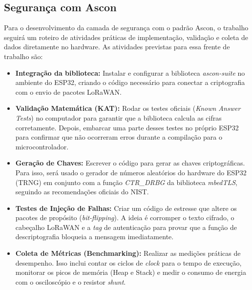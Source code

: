 

\subsection{Segurança com Ascon}
Para o desenvolvimento da camada de segurança com o padrão Ascon, o trabalho seguirá um roteiro de atividades práticas de implementação, validação e coleta de dados diretamente no hardware. As atividades previstas para essa frente de trabalho são:

\begin{itemize}
    \item \textbf{Integração da biblioteca:} Instalar e configurar a biblioteca \textit{ascon-suite} no ambiente do ESP32, criando o código necessário para conectar a criptografia com o envio de pacotes LoRaWAN.
    
    \item \textbf{Validação Matemática (KAT):} Rodar os testes oficiais (\textit{Known Answer Tests}) no computador para garantir que a biblioteca calcula as cifras corretamente. Depois, embarcar uma parte desses testes no próprio ESP32 para confirmar que não ocorreram erros durante a compilação para o microcontrolador.
    
    \item \textbf{Geração de Chaves:} Escrever o código para gerar as chaves criptográficas. Para isso, será usado o gerador de números aleatórios do hardware do ESP32 (TRNG) em conjunto com a função \textit{CTR\_DRBG} da biblioteca \textit{mbedTLS}, seguindo as recomendações oficiais do NIST.
    
    \item \textbf{Testes de Injeção de Falhas:} Criar um código de estresse que altere os pacotes de propósito (\textit{bit-flipping}). A ideia é corromper o texto cifrado, o cabeçalho LoRaWAN e a \textit{tag} de autenticação para provar que a função de descriptografia bloqueia a mensagem imediatamente.
    
    \item \textbf{Coleta de Métricas (Benchmarking):} Realizar as medições práticas de desempenho. Isso inclui contar os ciclos de \textit{clock} para o tempo de execução, monitorar os picos de memória (Heap e Stack) e medir o consumo de energia com o osciloscópio e o resistor \textit{shunt}.
\end{itemize}



